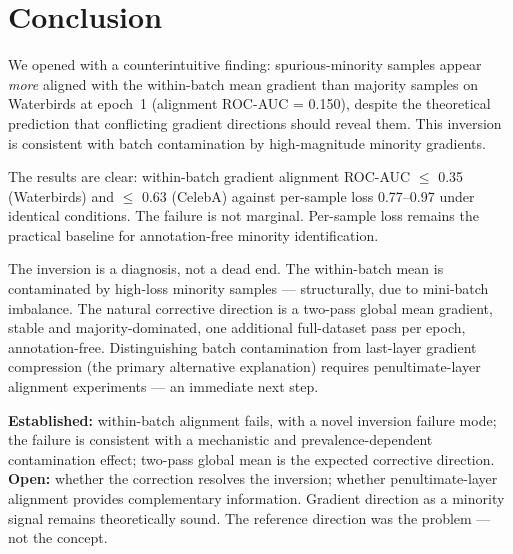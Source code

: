 \section{Conclusion}
\label{sec:conclusion}

We opened with a counterintuitive finding: spurious-minority samples appear \emph{more} aligned with the within-batch mean gradient than majority samples on Waterbirds at epoch~1 (alignment ROC-AUC = 0.150), despite the theoretical prediction that conflicting gradient directions should reveal them.
This inversion is consistent with batch contamination by high-magnitude minority gradients.

The results are clear: within-batch gradient alignment ROC-AUC $\leq$ 0.35 (Waterbirds) and $\leq$ 0.63 (CelebA) against per-sample loss 0.77--0.97 under identical conditions.
The failure is not marginal.
Per-sample loss remains the practical baseline for annotation-free minority identification.

The inversion is a diagnosis, not a dead end.
The within-batch mean is contaminated by high-loss minority samples --- structurally, due to mini-batch imbalance.
The natural corrective direction is a two-pass global mean gradient, stable and majority-dominated, one additional full-dataset pass per epoch, annotation-free.
Distinguishing batch contamination from last-layer gradient compression (the primary alternative explanation) requires penultimate-layer alignment experiments --- an immediate next step.

\textbf{Established:} within-batch alignment fails, with a novel inversion failure mode; the failure is consistent with a mechanistic and prevalence-dependent contamination effect; two-pass global mean is the expected corrective direction.
\textbf{Open:} whether the correction resolves the inversion; whether penultimate-layer alignment provides complementary information.
Gradient direction as a minority signal remains theoretically sound.
The reference direction was the problem --- not the concept.
